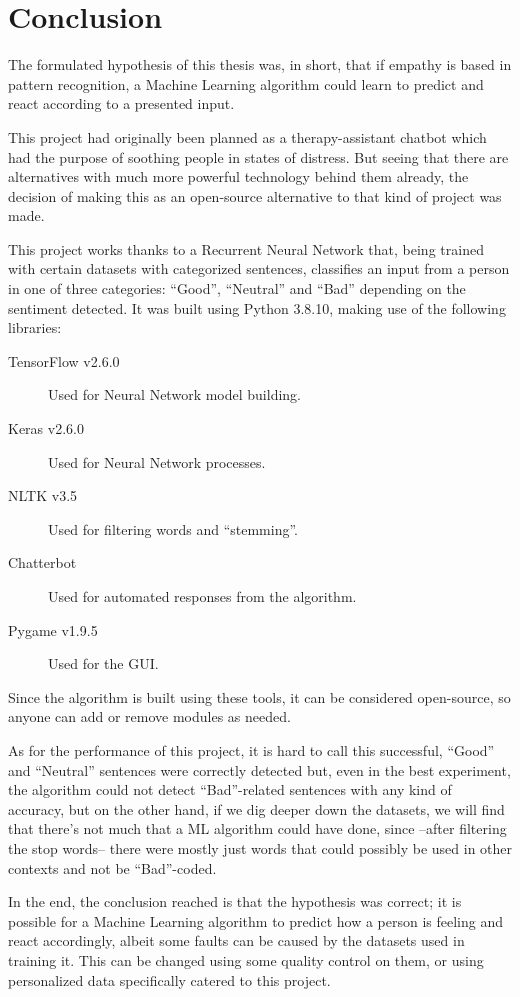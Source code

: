\chapter{Conclusion}
\label{ch6}
The formulated hypothesis of this thesis was, in short, that if empathy is based in pattern recognition, a Machine Learning algorithm could learn to predict and react according to a presented input.

This project had originally been planned as a therapy-assistant chatbot which had the purpose of soothing people in states of distress. But seeing that there are alternatives with much more powerful technology behind them already, the decision of making this as an open-source alternative to that kind of project was made.

This project works thanks to a Recurrent Neural Network that, being trained with certain datasets with categorized sentences, classifies an input from a person in one of three categories: ``Good'', ``Neutral'' and ``Bad'' depending on the sentiment detected. It was built using Python 3.8.10, making use of the following libraries:
\begin{description}
	\item[TensorFlow v2.6.0]{Used for Neural Network model building.}
	\item[Keras v2.6.0]{Used for Neural Network processes.}
	\item[NLTK v3.5]{Used for filtering words and ``stemming''.}
	\item[Chatterbot]{Used for automated responses from the algorithm.}
	\item[Pygame v1.9.5]{Used for the GUI.}
\end{description}

Since the algorithm is built using these tools, it can be considered open-source, so anyone can add or remove modules as needed.

As for the performance of this project, it is hard to call this successful, ``Good'' and ``Neutral'' sentences were correctly detected but, even in the best experiment, the algorithm could not detect ``Bad''-related sentences with any kind of accuracy, but on the other hand, if we dig deeper down the datasets, we will find that there's not much that a ML algorithm could have done, since --after filtering the stop words-- there were mostly just words that could possibly be used in other contexts and not be ``Bad''-coded.

In the end, the conclusion reached is that the hypothesis was correct; it is possible for a Machine Learning algorithm to predict how a person is feeling and react accordingly, albeit some faults can be caused by the datasets used in training it. This can be changed using some quality control on them, or using personalized data specifically catered to this project.

